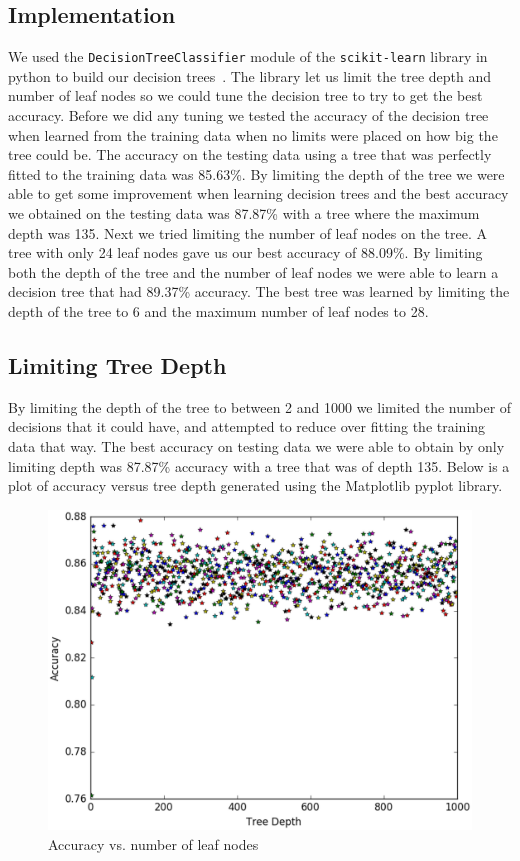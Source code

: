 \documentclass{article} %
\begin{document}
\subsection{Implementation}
We used the \texttt{DecisionTreeClassifier} module of the \texttt{scikit-learn}
library in python to build our decision trees~\cite{sklearn}. The library let us limit the tree
depth and number of leaf nodes so we could tune the decision tree to try to get
the best accuracy. Before we did any tuning we tested the accuracy of the decision
tree when learned from the training data when no limits were placed on how big the
tree could be. The accuracy on the testing data using a tree that was perfectly
fitted to the training data was 85.63\%. By limiting the depth of the tree we were
able to get some improvement when learning decision trees and the best accuracy we obtained on the testing data
was 87.87\% with a tree where the maximum depth was 135. Next we tried limiting
the number of leaf nodes on the tree. A tree with only 24 leaf nodes gave us our
best accuracy of 88.09\%. By limiting both the depth of the tree and the number
of leaf nodes we were able to learn a decision tree that had 89.37\% accuracy.
The best tree was learned by limiting the depth of the tree to 6 and the maximum number
of leaf nodes to 28.

\subsection{Limiting Tree Depth}
By limiting the depth of the tree to between 2 and 1000 we limited the number of
decisions that it could have, and attempted to reduce over fitting the training
data that way. The best accuracy on testing data we were able to obtain by only
limiting depth was 87.87\% accuracy with a tree that was of depth 135. Below is
a plot of accuracy versus tree depth generated using the Matplotlib pyplot\cite{pyplot} library.

\begin{figure}[H]
\includegraphics[scale=.5]{accuracy-vs-depth}
\caption{Accuracy vs. number of leaf nodes}
\end{figure}
\end{document}
